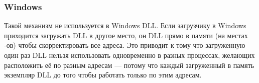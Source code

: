 \subsubsection{Windows}

Такой механизм не используется в Windows DLL. Если загрузчику в Windows приходится загружать DLL 
в другое место, он  DLL прямо в памяти (на местах -ов) чтобы скорректировать 
все адреса.
Это приводит к тому что загруженную один раз DLL нельзя использовать одновременно в разных 
процессах, желающих расположить её по разным адресам --- потому что каждый загруженный в память 
экземпляр DLL  до того чтобы работать только по этим адресам.

